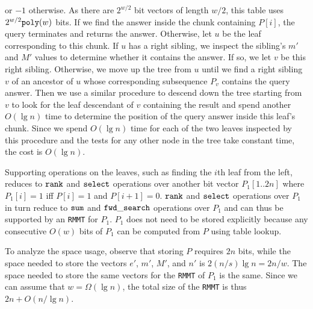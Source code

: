 or $-1$ otherwise.  As there are $2^{w/2}$ bit vectors of length
$w/2$, this table uses $2^{w/2}\mathtt{poly}(w)$ bits.  If we find the answer
inside the chunk containing $P[i]$, the query terminates and returns
the answer.  Otherwise, let $u$ be the leaf corresponding to this
chunk.  If $u$ has a right sibling, we inspect the sibling's $m'$ and
$M'$ values to determine whether it contains the answer.  If so, we
let $v$ be this right sibling.  Otherwise, we move up the tree from
$u$ until we find a right sibling $v$ of an ancestor of $u$ whose
corresponding subsequence $P_v$ contains the query answer.  Then we
use a similar procedure to descend down the tree starting from $v$ to
look for the leaf descendant of $v$ containing the result and spend
another $O(\lg n)$ time to determine the position of the query answer
inside this leaf's chunk.  Since we spend $O(\lg n)$ time for each of
the two leaves inspected by this procedure and the tests for any other
node in the tree take constant time, the cost is $O(\lg n)$.

Supporting operations on the leaves, such as finding the $i$th leaf
from the left, reduces to $\mathtt{rank}$ and $\mathtt{select}$ operations over
another bit vector $P_1[1..2n]$ where $P_1[i] = 1$ iff $P[i] = 1$ and
$P[i+1] = 0$.  $\mathtt{rank}$ and $\mathtt{select}$ operations over $P_1$ in turn
reduce to $\mathtt{sum}$ and $\mathtt{fwd\_search}$ operations over $P_1$ and can thus
be supported by an {\tt RMMT} for $P_1$.  $P_1$ does not need to be
stored explicitly because any consecutive $O(w)$ bits of $P_1$ can be
computed from $P$ using table lookup.

To analyze the space usage, observe that storing $P$ requires $2n$
bits, while the space needed to store the vectors $e'$, $m'$, $M'$,
and $n'$ is $2(n/s) \lg n = 2n/w$.  The space needed to store the same
vectors for the {\tt RMMT} of $P_1$ is the same.  Since we can assume
that $w = \Omega(\lg n)$, the total size of the {\tt RMMT} is thus
$2n + O(n / \lg n)$.
